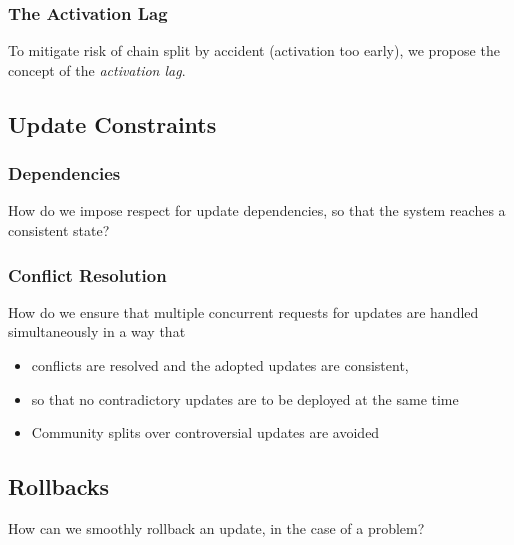 \subsubsection{The Activation Lag}
To mitigate risk of chain split by accident (activation too early), we propose the concept of the \emph{activation lag}.




\subsection{Update Constraints}

\subsubsection{Dependencies}
How do we impose respect for update dependencies, so that the system reaches a consistent state? 


\subsubsection{Conflict Resolution}
How do we ensure that multiple concurrent requests for updates are handled simultaneously in a way that
\begin{itemize}
\item conflicts are resolved and the adopted updates are consistent, 
\item so that no contradictory updates are to be deployed at the same time
\item Community splits over controversial updates are avoided
\end{itemize}


\subsection{Rollbacks}
How can we smoothly rollback an update, in the case of a problem?


